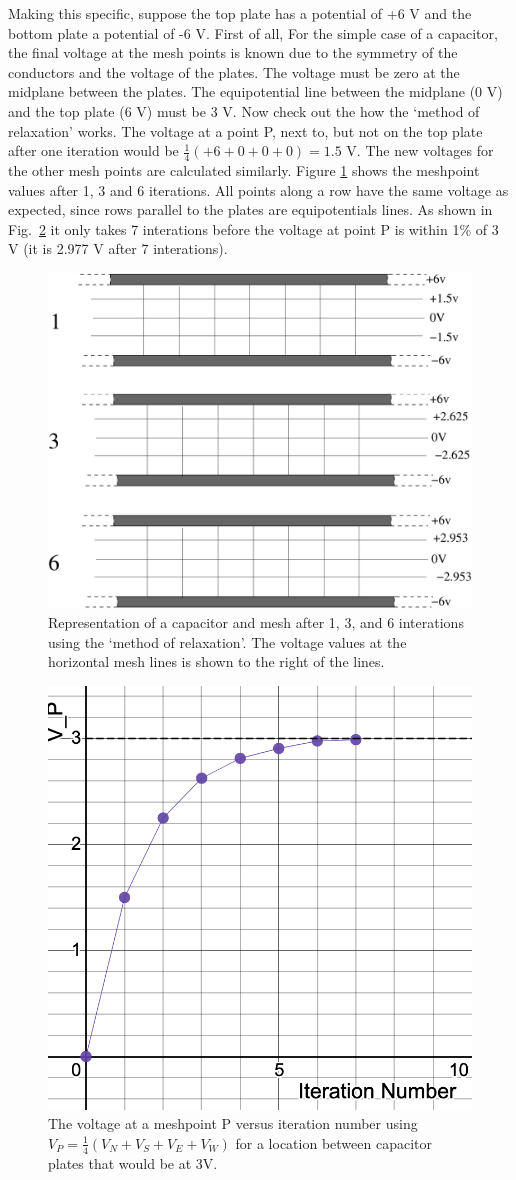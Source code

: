 \documentclass[12pt]{article}
\begin{document}
\begin{flushleft}
Making this specific, suppose the top plate has a potential of +6 V and the bottom plate a potential of -6 V.  First of all,  For the simple case of a capacitor, the final voltage at the mesh points is known due to the symmetry of the conductors and the voltage of the plates.  The voltage must be zero at the midplane between the plates.  The equipotential line between the midplane (0 V) and the top plate (6 V) must be 3 V.  Now check out the how the `method of relaxation' works.  The voltage at a point P, next to, but not on the top plate after one iteration would be $\frac{1}{4}(+6+0+0+0) = 1.5$ V.  The new voltages for the other mesh points are calculated similarly.  Figure \ref{fig:viterate} shows the meshpoint values after 1, 3 and 6 iterations.  All points along a row have the same voltage as expected, since rows parallel to the plates are equipotentials lines.   As shown in Fig.~\ref{fig:v_at_P} it only takes 7 interations before the voltage at point P is within 1\% of 3 V (it is 2.977 V after 7 interations).

\begin{figure}[h]
\centering
\includegraphics*[trim=0cm 0cm 0cm 0cm, clip=true, width=0.5\columnwidth]{viterate.pdf}
\caption{\small Representation of a capacitor and mesh after 1, 3, and 6 interations using the `method of relaxation'.  The voltage values at the horizontal mesh lines is shown to the right of the lines.}
\label{fig:viterate}
\end{figure}

\vspace{.3in}

\begin{figure}[h]
\centering
\includegraphics*[trim=0cm 0cm 0cm 0cm, clip=true, width=0.4\columnwidth]{v_at_P.png}
\caption{\small The voltage at a meshpoint P versus iteration number using $V_{P}=\frac{1}{4}\left( V_{N}+V_{S}+V_{E}+V_{W} \right)$ for a location between capacitor plates that would be at 3V.}
\label{fig:v_at_P}
\end{figure}

\afterpage{\clearpage}

\end{flushleft}
\end{document}
